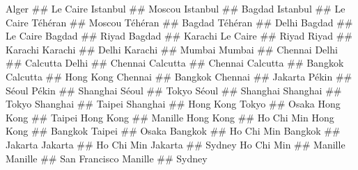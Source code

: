 Alger	##	Le Caire
Istanbul	##	Moscou
Istanbul	##	Bagdad
Istanbul	##	Le Caire
Téhéran	##	Moscou
Téhéran	##	Bagdad
Téhéran	##	Delhi
Bagdad	##	Le Caire
Bagdad	##	Riyad
Bagdad	##	Karachi
Le Caire	##	Riyad
Riyad	##	Karachi
Karachi	##	Delhi
Karachi	##	Mumbai
Mumbai ## Chennai
Delhi	##	 Calcutta
Delhi	##	 Chennai
Calcutta	## 	Chennai
Calcutta	## 	Bangkok
Calcutta	## 	Hong Kong
Chennai	##	Bangkok
Chennai	##	Jakarta
Pékin	##	Séoul
Pékin	##	Shanghai
Séoul 	##	Tokyo
Séoul	##	Shanghai
Shanghai	##	Tokyo
Shanghai	##	Taipei
Shanghai	##	Hong Kong
Tokyo	##	Osaka
Hong Kong	##	Taipei
Hong Kong	##	Manille
Hong Kong	##	Ho Chi Min
Hong Kong	##	Bangkok
Taipei	## Osaka
Bangkok	##	Ho Chi Min
Bangkok	##	Jakarta
Jakarta	##	Ho Chi Min
Jakarta	##	Sydney
Ho Chi Min	##	Manille
Manille	##	San Francisco
Manille	##	Sydney

































